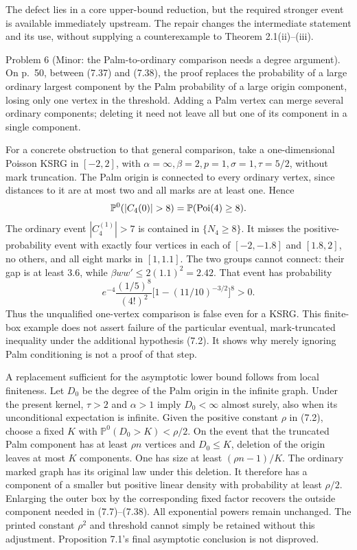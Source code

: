 \documentclass[10pt]{article}
\begin{document}
The defect lies in a core upper-bound reduction, but the required stronger event is available immediately upstream. The repair changes the intermediate statement and its use, without supplying a counterexample to Theorem 2.1(ii)–(iii).\par
Problem 6 (Minor: the Palm-to-ordinary comparison needs a degree argument).  On p. 50, between (7.37) and (7.38), the proof replaces the probability of a large ordinary largest component by the Palm probability of a large origin component, losing only one vertex in the threshold. Adding a Palm vertex can merge several ordinary components; deleting it need not leave all but one of its component in a single component.\par
For a concrete obstruction to that general comparison, take a one-dimensional Poisson KSRG in \([-2,2]\), with \(\alpha=\infty,\beta=2,p=1,\sigma=1,\tau=5/2\), without mark truncation. The Palm origin is connected to every ordinary vertex, since distances to it are at most two and all marks are at least one. Hence \[\mathbb P^0(|C_4(0)|>8)=\mathbb P({\rm Poi}(4)\geq8).\] The ordinary event \(|C_4^{(1)}|>7\) is contained in \(\{N_4\geq8\}\). It misses the positive-probability event with exactly four vertices in each of \([-2,-1.8]\) and \([1.8,2]\), no others, and all eight marks in \([1,1.1]\). The two groups cannot connect: their gap is at least \(3.6\), while \(\beta w w'\leq2(1.1)^2=2.42\). That event has probability \[e^{-4}\frac{(1/5)^8}{(4!)^2}
       \bigl[1-(11/10)^{-3/2}\bigr]^8>0.\] Thus the unqualified one-vertex comparison is false even for a KSRG. This finite-box example does not assert failure of the particular eventual, mark-truncated inequality under the additional hypothesis (7.2). It shows why merely ignoring Palm conditioning is not a proof of that step.\par
A replacement sufficient for the asymptotic lower bound follows from local finiteness. Let \(D_0\) be the degree of the Palm origin in the infinite graph. Under the present kernel, \(\tau>2\) and \(\alpha>1\) imply \(D_0<\infty\) almost surely, also when its unconditional expectation is infinite. Given the positive constant \(\rho\) in (7.2), choose a fixed \(K\) with \(\mathbb P^0(D_0>K)<\rho/2\). On the event that the truncated Palm component has at least \(\rho n\) vertices and \(D_0\leq K\), deletion of the origin leaves at most \(K\) components. One has size at least \((\rho n-1)/K\). The ordinary marked graph has its original law under this deletion. It therefore has a component of a smaller but positive linear density with probability at least \(\rho/2\). Enlarging the outer box by the corresponding fixed factor recovers the outside component needed in (7.7)–(7.38). All exponential powers remain unchanged. The printed constant \(\rho^2\) and threshold cannot simply be retained without this adjustment. Proposition 7.1’s final asymptotic conclusion is not disproved.\par
\end{document}
